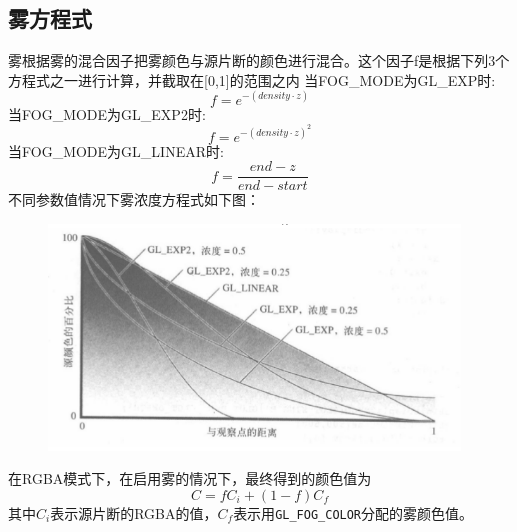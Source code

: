 \documentclass[a4paper,10pt]{article}
\begin{document}
\begin{CJK}{UTF8}{song}
\section{雾方程式}
雾根据雾的混合因子把雾颜色与源片断的颜色进行混合。这个因子f是根据下列3个方程式之一进行计算，并截取在[0,1]的范围之内
当FOG\_MODE为GL\_EXP时:
\begin{displaymath}
 f=e^{-(density\cdot{}z)}
\end{displaymath}
当FOG\_MODE为GL\_EXP2时:
\begin{displaymath}
 f=e^{-(density\cdot{}z)^2}
\end{displaymath}
当FOG\_MODE为GL\_LINEAR时:
\begin{displaymath}
 f=\frac{end-z}{end-start}
\end{displaymath}
不同参数值情况下雾浓度方程式如下图：
\begin{figure}[hbtp]
\centering
 \includegraphics[height=60mm]{fog_dagram.png}
\end{figure}
在RGBA模式下，在启用雾的情况下，最终得到的颜色值为
\begin{displaymath}
 C=fC_{i}+(1-f)C_{f}
\end{displaymath}
其中$C_{i}$表示源片断的RGBA的值，$C_{f}$表示用\verb|GL_FOG_COLOR|分配的雾颜色值。








\end{CJK}
\end{document}
